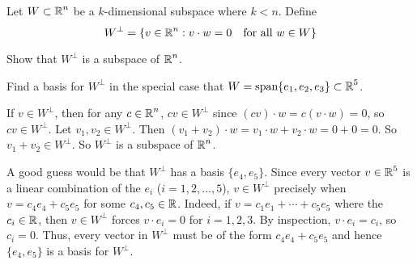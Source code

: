 \documentclass{ximera}
\author{Matthew Carr}
\begin{document}

\begin{exercise}\label{mc.exercise11}

Let $W\subset \mbox{$\mathbb{R}$}^n$ be a $k$-dimensional subspace where $k<n$.  Define
\[
W^\perp = \{v\in\mbox{$\mathbb{R}$}^n: v\cdot w = 0\quad \mbox{for all $w\in W$} \}
\]
\begin{enumeratea}
\item Show that $W^\perp$ is a subspace of $\mbox{$\mathbb{R}$}^n$.
\item Find a basis for $W^\perp$ in the special case that $W = \mathrm{span}\{e_1,e_2,e_3\}\subset\mbox{$\mathbb{R}$}^5$.

\end{enumeratea}

  
\begin{solution}


\soln \begin{enumeratea}
\item If $v\in W^\perp$, then for any $c\in\mbox{$\mathbb{R}$}^n$, $cv\in W^\perp$ since $(cv)\cdot w=c(v\cdot w)=0$, so $cv\in W^\perp$. Let $v_1,v_2\in W^\perp$. Then $(v_1+v_2)\cdot w=v_1\cdot w+v_2\cdot w=0+0=0$. So $v_1+v_2\in W^\perp$. So $W^\perp$ is a subspace of $\mbox{$\mathbb{R}$}^n$.
\item A good guess would be that $W^\perp$ has a basis $\{e_4,e_5\}$. Since every vector $v\in\mbox{$\mathbb{R}$}^5$ is a linear combination of the $e_i$ ($i=1,2,\ldots,5$), $v\in W^\perp$ precisely when $v=c_4 e_4+c_5 e_5$ for some $c_4,c_5\in\mbox{$\mathbb{R}$}$. Indeed, if $v=c_1e_1+\cdots+c_5e_5$ where the $c_i\in\mbox{$\mathbb{R}$}$, then $v\in W^\perp$ forces $v\cdot e_i=0$ for $i=1,2,3$. By inspection, $v\cdot e_i=c_i$, so $c_i=0$. Thus, every vector in $W^\perp$ must be of the form $c_4 e_4+c_5 e_5$ and hence $\{e_4,e_5\}$ is a basis for $W^\perp$. 
\end{enumeratea}


\end{solution}
\end{exercise}
\end{document}
